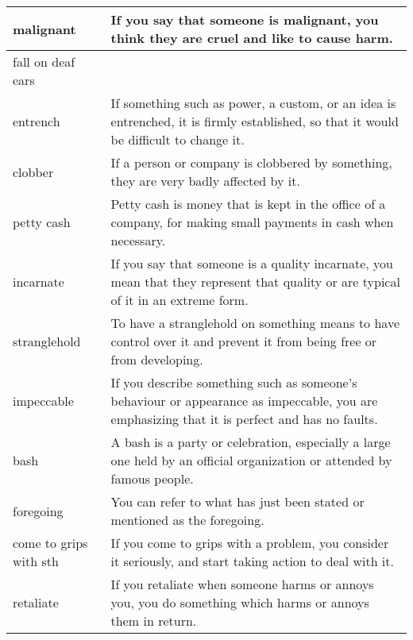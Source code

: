 \documentclass{article}
\begin{document}
\begin{center}
\begin{longtable}{|l|p{7.8cm}|}
\hline
malignant
&
If you say that someone is malignant, you think they are cruel and like to cause harm.
\\

\hline
fall on deaf ears
&

\\

\hline
entrench
&
If something such as power, a custom, or an idea is entrenched, it is firmly established, so that it would be difficult to change it.
\\

\hline
clobber
&
If a person or company is clobbered by something, they are very badly affected by it.
\\

\hline
petty cash
&
Petty cash is money that is kept in the office of a company, for making small payments in cash when necessary.
\\

\hline
incarnate
&
If you say that someone is a quality incarnate, you mean that they represent that quality or are typical of it in an extreme form.
\\

\hline
stranglehold
&
To have a stranglehold on something means to have control over it and prevent it from being free or from developing.
\\

\hline
impeccable
&
If you describe something such as someone's behaviour or appearance as impeccable, you are emphasizing that it is perfect and has no faults.
\\

\hline
bash
&
A bash is a party or celebration, especially a large one held by an official organization or attended by famous people.
\\

\hline
foregoing
&
You can refer to what has just been stated or mentioned as the foregoing.
\\

\hline
come to grips with sth
&
If you come to grips with a problem, you consider it seriously, and start taking action to deal with it.
\\

\hline
retaliate
&
If you retaliate when someone harms or annoys you, you do something which harms or annoys them in return.
\\

\hline

\end{longtable}
\end{center}
\end{document}
